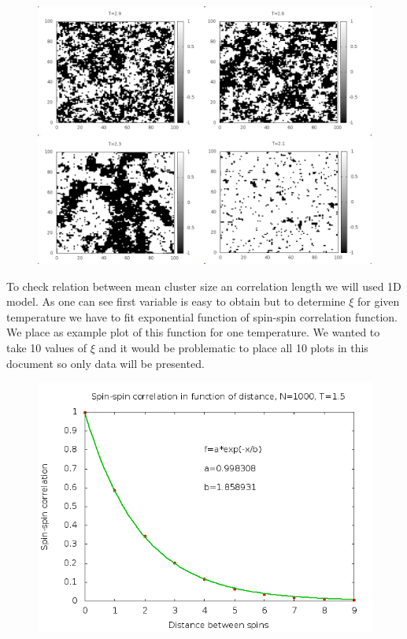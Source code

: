 \documentclass[a4paper,12pt,titlepage]{article}
\begin{document}
  \begin{figure}[th]
    \centering
    \includegraphics[scale=0.36]{plots/2DLattice.png}
  \end{figure}
 \newpage
  To check relation between mean cluster size an correlation length we will used 1D model. As one can see first variable is easy
  to obtain but to determine $\xi$ for given temperature we have to fit exponential function of spin-spin correlation function. We place
  as example plot of this function for one temperature. We wanted to take 10 values of $\xi$ and it would be problematic to place all
  10 plots in this document so only data will be presented.
  \begin{figure}[th]
    \centering
    \includegraphics[scale=0.5]{plots/IsingTestCorrelationLength.png}
  \end{figure}
  
\end{document}
